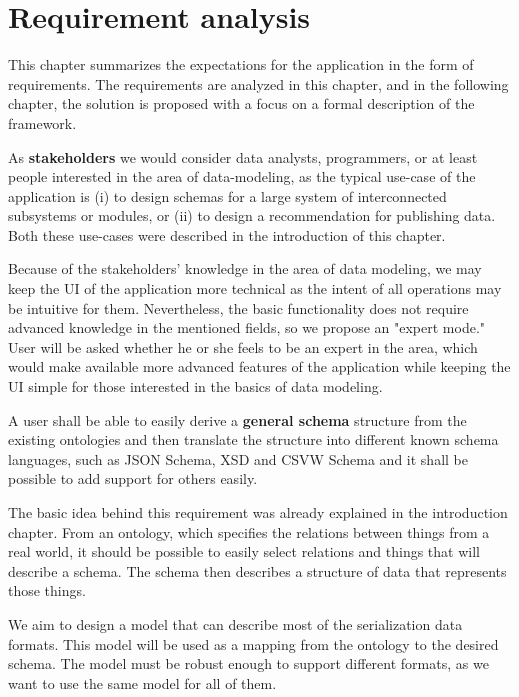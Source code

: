 \chapter{Requirement analysis}\label{chapters:analysis}

This chapter summarizes the expectations for the application in the form of requirements. The requirements are analyzed in this chapter, and in the following chapter, the solution is proposed with a focus on a formal description of the framework.

\bigskip

As \textbf{stakeholders} we would consider data analysts, programmers, or at least people interested in the area of data-modeling, as the typical use-case of the application is (i) to design schemas for a large system of interconnected subsystems or modules, or (ii) to design a recommendation for publishing data. Both these use-cases were described in the introduction of this chapter.

Because of the stakeholders' knowledge in the area of data modeling, we may keep the UI of the application more technical as the intent of all operations may be intuitive for them. Nevertheless, the basic functionality does not require advanced knowledge in the mentioned fields, so we propose an "expert mode." User will be asked whether he or she feels to be an expert in the area, which would make available more advanced features of the application while keeping the UI simple for those interested in the basics of data modeling.

\bigskip

\begin{requirement}
A user shall be able to easily derive a \textbf{general schema} structure from the existing ontologies and then translate the structure into different known schema languages, such as JSON Schema, XSD and CSVW Schema and it shall be possible to add support for others easily.
\end{requirement}

The basic idea behind this requirement was already explained in the introduction chapter. From an ontology, which specifies the relations between things from a real world, it should be possible to easily select relations and things that will describe a schema. The schema then describes a structure of data that represents those things.

\smallskip

We aim to design a model that can describe most of the serialization data formats. This model will be used as a mapping from the ontology to the desired schema. The model must be robust enough to support different formats, as we want to use the same model for all of them.

